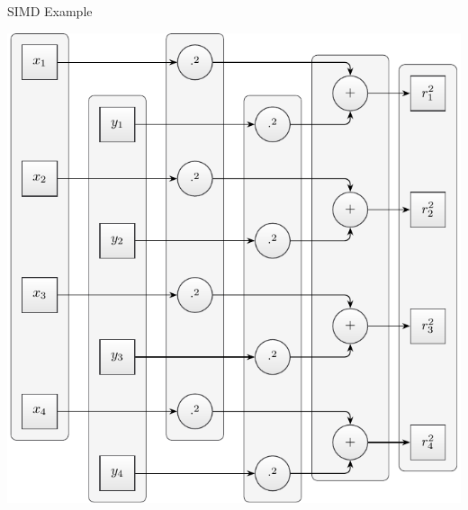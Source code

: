 \documentclass[aspectratio=169]{beamer}
\newcommand{\inputCodeBlock}[1]{%
    \begin{center}
        
    \end{center}
}
\begin{document}
    \begin{frame}{SIMD Example}
        \begin{minipage}{0.48\textwidth}
            \includegraphics[scale=0.5]{figures/radius_operation_simd.pdf}
        \end{minipage}
        \begin{minipage}[c]{0.50\textwidth}
          \begin{mybox}
            \inputCodeBlock{code/simd_example_avx.cpp}
          \end{mybox}
        \end{minipage}
    \end{frame}

\end{document}
